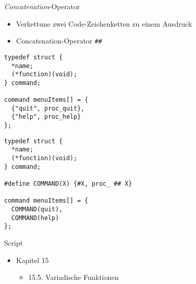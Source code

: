 
\begin{frame}[fragile]{\emph{Concatenation}-Operator}
%
\begin{itemize}
\item Verkettune zwei Code-Zeichenketten zu einem Ausdruck
\item Concatenation-Operator \texttt{\#\#}
\end{itemize}
%
%
\begin{codebox}
\begin{verbatim}
typedef struct {
  *name; 
  (*function)(void);
} command;

command menuItems[] = {
  {"quit", proc_quit},
  {"help", proc_help}
};
\end{verbatim}
\end{codebox}
%
\begin{codebox}
\begin{verbatim}
typedef struct {
  *name; 
  (*function)(void);
} command;

#define COMMAND(X) {#X, proc_ ## X}

command menuItems[] = {
  COMMAND(quit),
  COMMAND(help)
};
\end{verbatim}
\end{codebox}
%
\end{frame}


\begin{frame}{Script}
%
\begin{itemize}
\item Kapitel 15
	\begin{itemize}
	\item 15.5. Variadische Funktionen
	\end{itemize}
\end{itemize}
%
\end{frame}%

